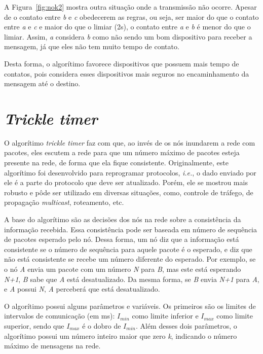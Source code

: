 \documentclass[11pt,a4paper,titlepage]{article}
\begin{document}
A Figura~\ref{fig:nok2} mostra outra situação onde a transmissão não ocorre.
Apesar de o contato entre \textit{b} e \textit{c} obedecerem as regras, ou seja, ser maior do que o contato entre \textit{a} e \textit{c} e maior do que o limiar (2s), o contato entre \textit{a} e \textit{b} é menor do que o limiar.
Assim, \textit{a} considera \textit{b} como não sendo um bom dispositivo para receber a mensagem, já que eles não tem muito tempo de contato.

Desta forma, o algorítimo favorece dispositivos que possuem mais tempo de contatos, pois considera esses dispositivos mais seguros no encaminhamento da mensagem até o destino.

\section{\textit{Trickle timer}}\label{sec:trickle}

O algorítimo \textit{trickle timer} faz com que, ao invés de os nós inundarem a rede com pacotes, eles escutem a rede para que um número máximo de pacotes esteja presente na rede, de forma que ela fique consistente.
Originalmente, este algorítimo foi desenvolvido para reprogramar protocolos, \textit{i.e.}, o dado enviado por ele é a parte do protocolo que deve ser atualizado.
Porém, ele se mostrou mais robusto e pôde ser utilizado em diversas situações, como, controle de tráfego, de propagação \textit{multicast}, roteamento, etc.

A base do algorítimo são as decisões dos nós na rede sobre a consistência da informação recebida.
Essa consistência pode ser baseada em número de sequência de pacotes esperado pelo nó.
Dessa forma, um nó diz que a informação está consistente se o número de sequência para aquele pacote é o esperado, e diz que não está consistente se recebe um número diferente do esperado.
Por exemplo, se o nó \textit{A} envia um pacote com um número \textit{N} para \textit{B}, mas este está esperando \textit{N+1}, \textit{B} sabe que \textit{A} está desatualizado.
Da mesma forma, se \textit{B} envia \textit{N+1} para \textit{A}, e \textit{A} possui \textit{N}, \textit{A} perceberá que está desatualizado.

O algorítimo possui alguns parâmetros e variáveis.
Os primeiros são os limites de intervalos de comunicação (em ms): $I_{min}$ como limite inferior e $I_{max}$ como limite superior, sendo que $I_{max}$ é o dobro de $I_{min}$.
Além desses dois parâmetros, o algorítimo possui um número inteiro maior que zero \textit{k}, indicando o número máximo de mensagens na rede.
\end{document}
